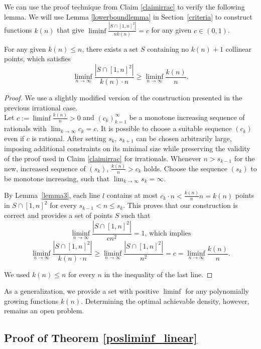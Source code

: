 \documentclass[11pt,a4paper]{article}
\numberwithin{equation}{section}
\begin{document}
\medskip
We can use the proof technique from Claim \ref{claimirrac} to verify the following lemma. 
We will use Lemma \ref{lowerboundlemma} in Section~\ref{criteria} to construct functions $k(n)$ that give $\liminf \frac{|S \cap [1,n]^2|}{n k(n)}=c$ for any given $c\in(0,1)$.\\
\begin{lemma}\label{lowerboundlemma}
For any given $k(n) \le n$, there exists a set $S$ containing no $k(n) + 1$ collinear points, which satisfies
$$\liminf_{n\to\infty} \frac{|S \cap [1,n]^2|}{k(n)\cdot n} \geq \liminf_{n\to\infty} \frac{k(n)}{n}.$$ 
\end{lemma}
\begin{proof}
We use a slightly modified version of the construction presented in the previous irrational case. ~\\
\noindent
Let $c:= \liminf \frac{k(n)}{n}>0$ and $(c_k)_{k=1}^{\infty}$ be a monotone increasing sequence of rationals with $\lim_{k\to\infty}c_k=c$. It is possible to choose a suitable sequence $(c_k)$ even if $c$ is rational.
After setting $s_k$, $s_{k+1}$ can be chosen arbitrarily large, imposing additional constraints on  its minimal size while preserving the validity of the proof used in Claim \ref{claimirrac} for irrationals. Whenever $n>s_{k-1}$ for the new, increased sequence of $(s_k)$, 
$\frac{k(n)}{n}>c_{k}$ holds. Choose the sequence $(s_k)$ to be monotone increasing, such that $\lim_{k\to \infty} s_k=\infty$. 

\noindent
By Lemma~\ref{lemma3}, each line $l$ contains at most $c_k\cdot n<\frac{k(n)}{n}n=k(n)$ points in $S\cap [1,n]^2$ for every $s_{k-1}<n\le  s_k$. This proves that our construction is correct and provides a set of points $S$ such that
$$\liminf_{n\to\infty} \frac{|S\cap [1,n]^2|}{c n^2} = 1\text{, which implies}$$
$$\liminf_{n\to\infty} \frac{|S\cap [1,n]^2|}{ k(n)\cdot n}\ge\liminf_{n\to\infty} \frac{|S\cap [1,n]^2|}{ n^2} = c=\liminf_{n\to\infty}\frac{k(n)}{n}.$$

We used $k(n) \le n$ for every $n$ in the inequality of the last line.

\end{proof}




As a generalization, we provide a set with positive $\liminf$ for any polynomially growing functions $k(n)$. Determining the optimal achievable density, however, remains an open problem.

\subsection{Proof of Theorem \ref{posliminf_linear}}
\end{document}

